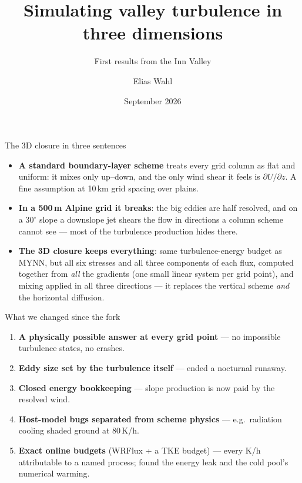 \documentclass[11pt,aspectratio=169]{beamer}
\title{Simulating valley turbulence in three dimensions}
\subtitle{First results from the Inn Valley}
\author{Elias Wahl}
\institute{University of Innsbruck}
\date{September 2026}
\begin{document}
\begin{frame}
  \titlepage
\end{frame}

\begin{frame}{The 3D closure in three sentences}
  \begin{itemize}
    \setlength{\itemsep}{2ex}
    \item \textbf{A standard boundary-layer scheme} treats every grid column
      as flat and uniform: it mixes only up--down, and the only wind shear it
      feels is $\partial U/\partial z$. A fine assumption at 10\,km grid
      spacing over plains.
    \item \textbf{In a 500\,m Alpine grid it breaks}: the big eddies are
      half resolved, and on a $30^\circ$ slope a downslope jet shears the
      flow in directions a column scheme cannot see --- most of the
      turbulence production hides there.
    \item \textbf{The 3D closure keeps everything}: same turbulence-energy
      budget as MYNN, but all six stresses and all three components of each
      flux, computed together from \emph{all} the gradients (one small linear
      system per grid point), and mixing applied in all three directions ---
      it replaces the vertical scheme \emph{and} the horizontal diffusion.
  \end{itemize}
\end{frame}

\begin{frame}{What we changed since the fork}
  \begin{enumerate}
    \item \textbf{A physically possible answer at every grid point} ---
      no impossible turbulence states, no crashes.
    \item \textbf{Eddy size set by the turbulence itself} --- ended a
      nocturnal runaway.
    \item \textbf{Closed energy bookkeeping} --- slope production is now paid
      by the resolved wind.
    \item \textbf{Host-model bugs separated from scheme physics} --- e.g.\
      radiation cooling shaded ground at 80\,K/h.
    \item \textbf{Exact online budgets} (WRFlux + a TKE budget) --- every
      K/h attributable to a named process; found the energy leak and the
      cold pool's numerical warming.
  \end{enumerate}
\end{frame}
\end{document}
